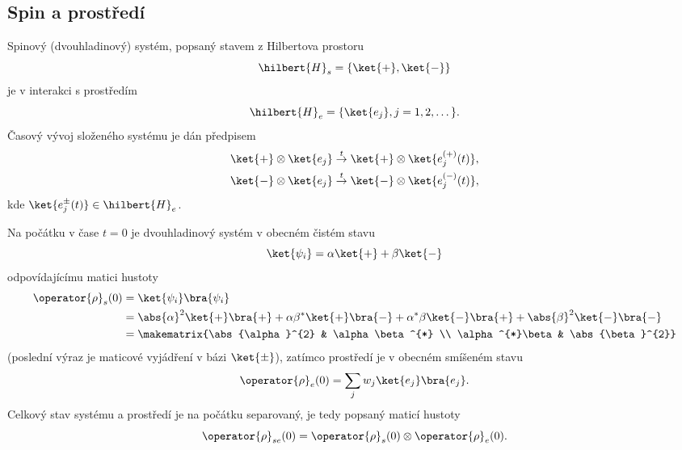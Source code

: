 \subsection{Spin a prostředí}
	Spinový (dvouhladinový) systém, popsaný stavem z Hilbertova prostoru 
	\begin{equation}
		\hilbert{H}_{s}=\{\ket{+},\ket{-}\}
	\end{equation}
	je v interakci s prostředím
	\begin{equation}
		\hilbert{H}_{e}=\{\ket{e_{j}},j=1,2,\dotsc\}.
	\end{equation}
	Časový vývoj složeného systému je dán předpisem
    \begin{subequations}
        \begin{align}
            \ket{+}\otimes\ket{e_{j}}
                &\stackrel{t}{\rightarrow}\ket{+}\otimes\ket{e_{j}^{(+)}(t)},\nonumber\\
            \ket{-}\otimes\ket{e_{j}}
                &\stackrel{t}{\rightarrow}\ket{-}\otimes\ket{e_{j}^{(-)}(t)},\\
        \end{align}            
        \label{eq:DecoherenceU}
    \end{subequations}
	kde $\ket{e_{j}^{\pm}(t)}\in\hilbert{H}_{e}$.
	
	Na počátku v čase $t=0$ je dvouhladinový systém v obecném čistém stavu
	\begin{equation}
		\label{eq:DecoherenceInitial}
		\ket{\psi_{i}}=\alpha\ket{+}+\beta\ket{-}
	\end{equation}
    odpovídajícímu matici hustoty
	\begin{align}
		\operator{\rho}_{s}(0)
			&=\ket{\psi_{i}}\bra{\psi_{i}}\nonumber\\
			&=\abs{\alpha}^{2}\ket{+}\bra{+}+\alpha\beta^{*}\ket{+}\bra{-}+\alpha^{*}\beta\ket{-}\bra{+}+\abs{\beta}^{2}\ket{-}\bra{-}\nonumber\\
			&=\makematrix{\abs{\alpha}^{2} & \alpha\beta^{*} \\ \alpha^{*}\beta & \abs{\beta}^{2}}
	\end{align}
	(poslední výraz je maticové vyjádření v bázi $\ket{\pm}$),
    zatímco prostředí je v obecném smíšeném stavu
	\begin{equation}
		\operator{\rho}_{e}(0)=\sum_{j}w_{j}\ket{e_{j}}\bra{e_{j}}.
	\end{equation}
    Celkový stav systému a prostředí je na počátku separovaný, je tedy popsaný maticí hustoty
	\begin{equation}
		\label{eq:DecoherenceDensityMatrix}
		\operator{\rho}_{se}(0)=\operator{\rho}_{s}(0)\otimes\operator{\rho}_{e}(0).
	\end{equation}
	
